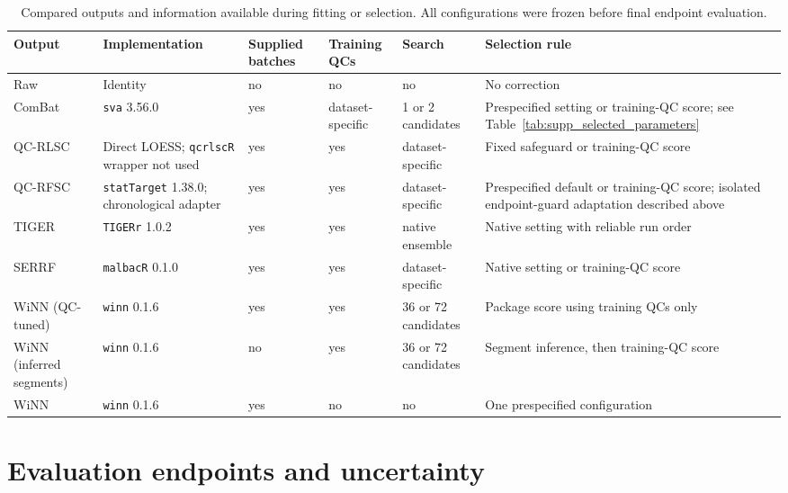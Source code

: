 \documentclass[namedate,webpdf,modern,large,nocrop]{oup-authoring-template}
\begin{document}
\begin{table}[tbp]
\centering
\small
\caption{Compared outputs and information available during fitting or selection. All configurations were frozen before final endpoint evaluation.}
\label{tab:supp_methods}
\begin{tabular}{p{2.0cm}p{2.9cm}p{1.0cm}p{1.1cm}p{1.7cm}p{4.8cm}}
\toprule
Output & Implementation & Supplied batches & Training QCs & Search & Selection rule \\
\midrule
Raw & Identity & no & no & no & No correction \\
ComBat & \texttt{sva} 3.56.0 & yes & dataset-specific & 1 or 2 candidates & Prespecified setting or training-QC score; see Table~\ref{tab:supp_selected_parameters} \\
QC-RLSC & Direct LOESS; \texttt{qcrlscR} wrapper not used & yes & yes & dataset-specific & Fixed safeguard or training-QC score \\
QC-RFSC & \texttt{statTarget} 1.38.0; chronological adapter & yes & yes & dataset-specific & Prespecified default or training-QC score; isolated endpoint-guard adaptation described above \\
TIGER & \texttt{TIGERr} 1.0.2 & yes & yes & native ensemble & Native setting with reliable run order \\
SERRF & \texttt{malbacR} 0.1.0 & yes & yes & dataset-specific & Native setting or training-QC score \\
WiNN (QC-tuned) & \texttt{winn} 0.1.6 & yes & yes & 36 or 72 candidates & Package score using training QCs only \\
WiNN (inferred segments) & \texttt{winn} 0.1.6 & no & yes & 36 or 72 candidates & Segment inference, then training-QC score \\
WiNN & \texttt{winn} 0.1.6 & yes & no & no & One prespecified configuration \\
\bottomrule
\end{tabular}
\end{table}

\begingroup

\endgroup

\section{Evaluation endpoints and uncertainty}
\label{sec:supp_endpoints}
\end{document}
